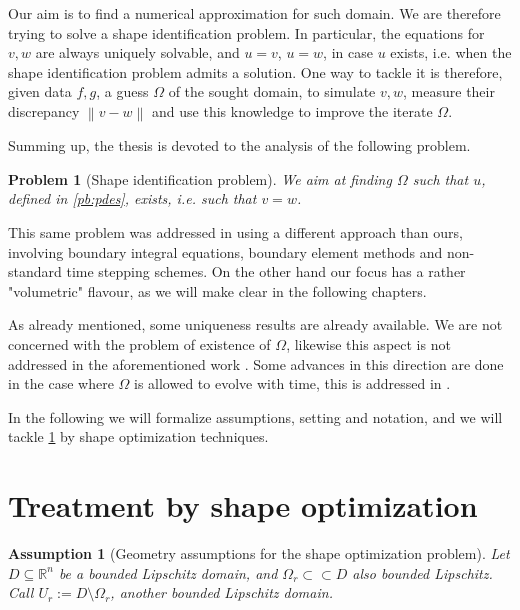 \documentclass[english,a4paper,9pt,oneside]{scrbook}	%
\theoremstyle{break}
\newtheorem{ass}[equation]{Assumption}
\newtheorem{pb}[equation]{Problem}
\theoremstyle{remark}
\newcommand{\mR}{\mathbb{R}}
\newcommand{\norm}[1]{\left\lVert#1\right\rVert}
\newcommand{\cc}{\subset\subset}
\begin{document}
Our aim is to find a numerical approximation for such domain. We are therefore trying to solve a shape identification problem. In particular, the equations for $v,w$ are always uniquely solvable, and $u=v$, $u=w$, in case $u$ exists, i.e. when the shape identification problem admits a solution. One way to tackle it is therefore, given data $f,g$, a guess $\Omega$ of the sought domain, to simulate $v,w$, measure their discrepancy $\norm{v-w}$ and use this knowledge to improve the iterate $\Omega$.


Summing up, the thesis is devoted to the analysis of the following problem.

\begin{pb}[Shape identification problem]
\label{pb:shid}
We aim at finding $\Omega$ such that $u$, defined in \cref{pb:pdes}, exists, i.e. such that $v=w$.
\end{pb}

This same problem was addressed in \cite{harbrecht} using a different approach than ours, involving boundary integral equations, boundary element methods and non-standard time stepping schemes. On the other hand our focus has a rather "volumetric" flavour, as we will make clear in the following chapters. 

As already mentioned, some uniqueness results are already available. We are not concerned with the problem of existence of $\Omega$, likewise this aspect is not addressed in the aforementioned work \cite{harbrecht}. Some advances in this direction are done in the case where $\Omega$ is allowed to evolve with time, this is addressed in \cite{brugger}.

In the following we will formalize assumptions, setting and notation, and we will tackle \cref{pb:shid} by shape optimization techniques.

\section{Treatment by shape optimization}
\label{sec:shopt_treatment}

\begin{ass}[Geometry assumptions for the shape optimization problem]
\label{ass:geo_sh}
Let $D\subseteq \mR^n$ be a bounded Lipschitz domain, and $\Omega_r \cc D$ also bounded Lipschitz. Call $U_r:=D\setminus \Omega_r$, another bounded Lipschitz domain.
\end{ass}
\end{document}
